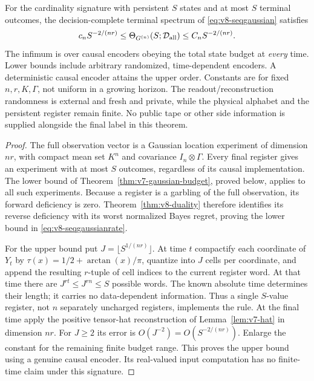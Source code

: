 \begin{theorem}
\label{thm:v8-seqgaussian}
For the cardinality signature with persistent $S$ states and at most
$S$ terminal outcomes, the decision-complete terminal spectrum of
\eqref{eq:v8-seqgaussian} satisfies
\begin{equation}
 c_n S^{-2/(nr)}\le
 \Theta_{G^{(n)}}(S;\mathcal D_{\rm all})
 \le C_n S^{-2/(nr)}.                                 \label{eq:v8-seqgaussianrate}
\end{equation}
The infimum is over causal encoders obeying the total state budget at
\emph{every} time. Lower bounds include arbitrary randomized,
time-dependent encoders. A deterministic causal encoder attains the
upper order. Constants are for fixed $n,r,K,\Gamma$, not uniform in a
growing horizon. The readout/reconstruction randomness is external and
fresh and private, while the physical alphabet and the persistent
register remain finite. No public tape or other side information is
supplied alongside the final label in this theorem.
\end{theorem}
\begin{proof}
The full observation vector is a Gaussian location experiment of
dimension $nr$, with compact mean set $K^n$ and covariance
$I_n\otimes\Gamma$. Every final register gives an experiment with at
most $S$ outcomes, regardless of its causal implementation. The lower
bound of Theorem~\ref{thm:v7-gaussian-budget}, proved below, applies to
all such experiments. Because a register is a garbling of the full
observation, its forward deficiency is zero. Theorem~\ref{thm:v8-duality}
therefore identifies its reverse deficiency with its worst normalized
Bayes regret, proving the lower bound in \eqref{eq:v8-seqgaussianrate}.

For the upper bound put $J=\lfloor S^{1/(nr)}\rfloor$. At time $t$
compactify each coordinate of $Y_t$ by
$\tau(x)=1/2+\arctan(x)/\pi$, quantize into $J$ cells per coordinate,
and append the resulting $r$-tuple of cell indices to the current
register word. At that time there are $J^{rt}\le J^{rn}\le S$
possible words. The known absolute time determines their length; it
carries no data-dependent information. Thus a single $S$-value
register, not $n$ separately uncharged registers, implements the rule.
At the final time apply the positive tensor-hat reconstruction of
Lemma~\ref{lem:v7-hat} in dimension $nr$. For $J\ge2$ its error is
$O(J^{-2})=O(S^{-2/(nr)})$. Enlarge the constant for the remaining
finite budget range. This proves the upper bound using a genuine causal
encoder. Its real-valued input computation has no finite-time claim
under this signature.
\end{proof}


